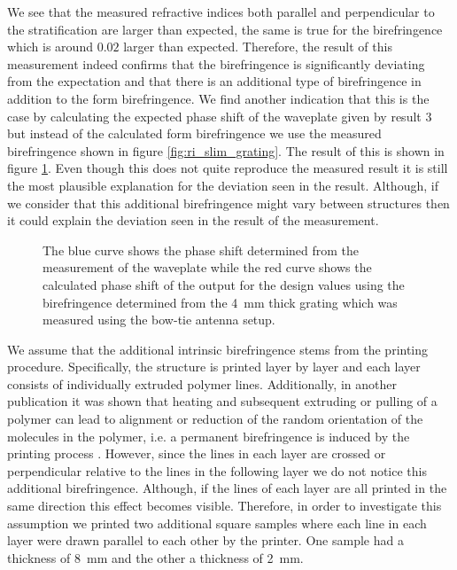 We see that the measured refractive indices both parallel and perpendicular to the stratification are larger than expected, the same is true for the birefringence which is around $0.02$ larger than expected. Therefore, the result of this measurement indeed confirms that the birefringence is significantly deviating from the expectation and that there is an additional type of birefringence in addition to the form birefringence. We find another indication that this is the case by calculating the expected phase shift of the waveplate given by result 3 but instead of the calculated form birefringence we use the measured birefringence shown in figure \ref{fig:ri_slim_grating}. The result of this is shown in figure \ref{fig:delta_gratings_bf}. Even though this does not quite reproduce the measured result it is still the most plausible explanation for the deviation seen in the result. Although, if we consider that this additional birefringence might vary between structures then it could explain the deviation seen in the result of the measurement.

\begin{figure}[H]
    \centering
    
    \caption{The blue curve shows the phase shift determined from the measurement of the waveplate while the red curve shows the calculated phase shift of the output for the design values using the birefringence determined from the \SI{4}{\milli \meter} thick grating which was measured using the bow-tie antenna setup.}
    \label{fig:delta_gratings_bf}
\end{figure}

We assume that the additional intrinsic birefringence stems from the printing procedure.
Specifically, the structure is printed layer by layer and each layer consists of individually extruded polymer lines. Additionally, in another publication it was shown that heating and subsequent extruding or pulling of a polymer can lead to alignment or reduction of the random orientation of the molecules in the polymer, i.e. a permanent birefringence is induced by the printing process \cite{Solr-urn:nbn:de:hebis:04-z2017-0786}. However, since the lines in each layer are crossed or perpendicular relative to the lines in the following layer we do not notice this additional birefringence. Although, if the lines of each layer are all printed in the same direction this effect becomes visible. Therefore, in order to investigate this assumption we printed two additional square samples where each line in each layer were drawn parallel to each other by the printer. One sample had a thickness of \SI{8}{\milli \meter} and the other a thickness of \SI{2}{\milli \meter}. 

